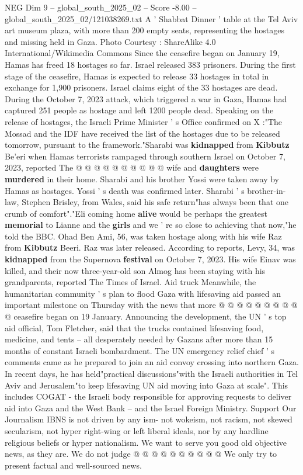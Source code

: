 \begin{textsample}{NEG Dim 9 – global\_south\_2025\_02 – Score -8.00 – global\_south\_2025\_02/121038269.txt}  \label{ex:f9_neg_185}
A ' Shabbat Dinner ' table at the Tel Aviv art museum plaza, with more than 200 empty seats, representing the hostages and missing held in Gaza.
Photo Courtesy : ShareAlike 4.0 International/Wikimedia Commons Since the ceasefire began on January 19, Hamas has freed 18 hostages so far.
Israel released 383 prisoners.
During the first stage of the ceasefire, Hamas is expected to release 33 hostages in total in exchange for 1,900 prisoners.
Israel claims eight of the 33 hostages are dead.
During the October 7, 2023 attack, which triggered a war in Gaza, Hamas had captured 251 people as hostage and left 1200 people dead.
Speaking on the release of hostages, the Israeli Prime Minister ' s Office confirmed on X :"The Mossad and the IDF have received the list of the hostages due to be released tomorrow, pursuant to the framework."Sharabi was \textbf{kidnapped} from \textbf{Kibbutz} Be'eri when Hamas terrorists rampaged through southern Israel on October 7, 2023, reported The @ @ @ @ @ @ @ @ @ @ wife and \textbf{daughters} were \textbf{murdered} in their home.
Sharabi and his brother Yossi were taken away by Hamas as hostages.
Yossi ' s death was confirmed later.
Sharabi ' s brother-in-law, Stephen Brisley, from Wales, said his safe return"has always been that one crumb of comfort"."Eli coming home \textbf{alive} would be perhaps the greatest \textbf{memorial} to Lianne and the \textbf{girls} and we ' re so close to achieving that now,"he told the BBC.
Ohad Ben Ami, 56, was taken hostage along with his wife Raz from \textbf{Kibbutz} Beeri.
Raz was later released.
According to reports, Levy, 34, was \textbf{kidnapped} from the Supernova \textbf{festival} on October 7, 2023.
His wife Einav was killed, and their now three-year-old son Almog has been staying with his grandparents, reported The Times of Israel.
Aid truck Meanwhile, the humanitarian community ' s plan to flood Gaza with lifesaving aid passed an important milestone on Thursday with the news that more @ @ @ @ @ @ @ @ @ @ ceasefire began on 19 January.
Announcing the development, the UN ' s top aid official, Tom Fletcher, said that the trucks contained lifesaving food, medicine, and tents -- all desperately needed by Gazans after more than 15 months of constant Israeli bombardment.
The UN emergency relief chief ' s comments came as he prepared to join an aid convoy crossing into northern Gaza.
In recent days, he has held"practical discussions"with the Israeli authorities in Tel Aviv and Jerusalem"to keep lifesaving UN aid moving into Gaza at scale".
This includes COGAT - the Israeli body responsible for approving requests to deliver aid into Gaza and the West Bank -- and the Israel Foreign Ministry.
Support Our Journalism IBNS is not driven by any ism- not wokeism, not racism, not skewed secularism, not hyper right-wing or left liberal ideals, nor by any hardline religious beliefs or hyper nationalism.
We want to serve you good old objective news, as they are.
We do not judge @ @ @ @ @ @ @ @ @ @ We only try to present factual and well-sourced news.

\end{textsample}
